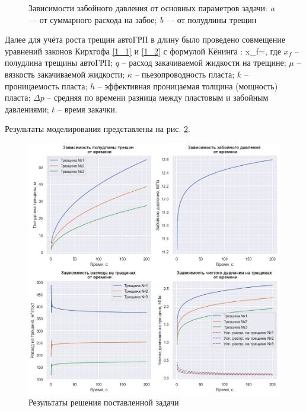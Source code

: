 \begin{figure}[H]
\begin{subfigure}[t]{\dimexpr.5\linewidth-1.3em\relax}
	\end{subfigure}
\captionsetup{justification=centering} %
\caption{Зависимости забойного давления от основных параметров задачи: {\itshape a} --- от суммарного расхода на забое; {\itshape b} --- от полудлины трещин} 
\label{fig:results1}
\end{figure}

Далее для учёта роста трещин автоГРП в длину было проведено совмещение уравнений законов Кирхгофа \eqref{1_1} и \eqref{1_2} с формулой Кёнинга \cite{koning_book}:
\beq
x_f=,
\eeq
где $x_f$ -- полудлина трещины автоГРП;\newline
$q$ -- расход закачиваемой жидкости на трещине;\newline
$\mu$ -- вязкость закачиваемой жидкости;\newline
$\kappa$ -- пьезопроводность пласта;\newline
$k$ -- проницаемость пласта;\newline
$h$ -- эффективная проницаемая толщина (мощность) пласта;\newline
$\Delta p$ -- средняя по времени разница между пластовым и забойным давлениями;\newline
$t$ -- время закачки.

Результаты моделирования представлены на рис. \ref{fig:results2}.
 
\begin{figure}[H] 
\center
\includegraphics[width=\linewidth]{images/Kirchhoff+Koning.png}
\caption{Результаты решения поставленной задачи} 
\label{fig:results2}  
\end{figure}

